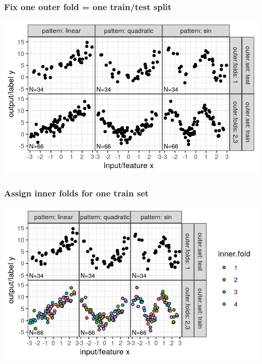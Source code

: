 \documentclass{beamer}
\begin{document}
\begin{frame}
  \frametitle{Fix one outer fold = one train/test split}

  \includegraphics[width=\textwidth]{figure-overfitting-cv-data-test-fold-1.png}
  
\end{frame}

\begin{frame}
  \frametitle{Assign inner folds for one train set}

  \includegraphics[width=\textwidth]{figure-overfitting-cv-data-inner-folds-1.png}
  
\end{frame}
\end{document}
